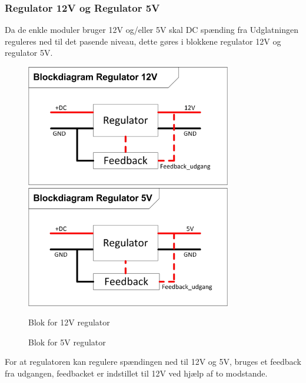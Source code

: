 \subsubsection{Regulator 12V og Regulator 5V}
Da de enkle moduler bruger 12V og/eller 5V skal DC spænding fra Udglatningen reguleres ned til det pasende niveau, dette gøres i blokkene regulator 12V og regulator 5V.
\begin{figure}[H]
	\centering
	\begin{minipage}[b]{0.48\textwidth}\centering
	\includegraphics[width=0.80\textwidth]{billeder/Regulering_12VBlok}
	\end{minipage}
	\begin{minipage}[b]{0.48\textwidth}\centering
	\includegraphics[width=0.80\textwidth]{billeder/Regulering_5VBlok}
	\end{minipage}
	\begin{minipage}[t]{0.48\textwidth}
	\caption{Blok for 12V regulator}
	\label{fig:Regulering_12VBlok}
	\end{minipage}
	\begin{minipage}[t]{0.48\textwidth}
	\caption{Blok for 5V regulator}
	\label{fig:Regulering_5VBlok}
	\end{minipage}
	\end{figure}
For at regulatoren kan regulere spændingen ned til 12V og 5V, bruges et feedback fra udgangen, feedbacket er indstillet til 12V ved hjælp af to modstande. \\




